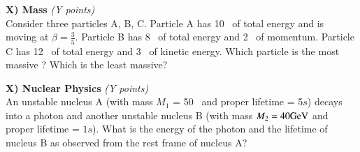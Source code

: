 {\clearpage

\textbf{X) Mass }\hfill \textit{(Y points)}\\
Consider three particles A, B, C.
Particle A has 10 \GeV\ of total energy and is moving at $\beta = \frac{3}{5}$.
Particle B has 8 \GeV\ of total energy and 2 \GeV\ of momentum.
Particle C has 12 \GeV\ of total energy and 3 \GeV\ of kinetic energy.
Which particle is the most massive ?
Which is the least massive?


\vspace{0.1in}



%
%

\textbf{X) Nuclear Physics }\hfill \textit{(Y points)}\\

An unstable nucleus A (with mass $M_1$ = 50 \GeV\ and proper lifetime = 5$s$) decays into a photon and another unstable nucleus B (with mass $M_2 = 40\textrm{GeV}$ and proper lifetime = $1s$).
What is the energy of the photon and the lifetime of nucleus B as observed from the rest frame of nucleus A?


} %

